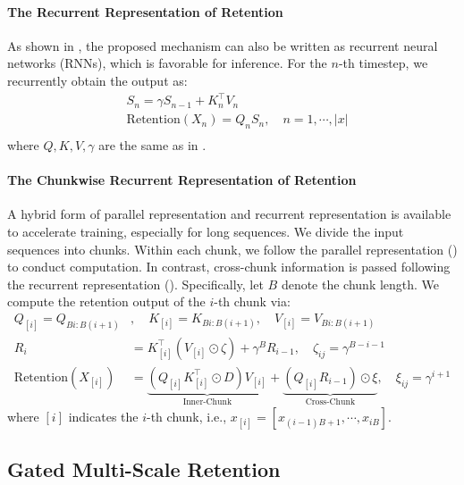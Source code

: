 \documentclass{article}
\begin{document}
\paragraph{The Recurrent Representation of Retention}
As shown in , the proposed mechanism can also be written as recurrent neural networks (RNNs), which is favorable for inference.
For the $n$-th timestep, we recurrently obtain the output as:
\begin{equation}
\begin{aligned}
\label{eq:ret:recurrent}
&S_n = \gamma S_{n-1} + K_n^{\intercal} V_n \\
&\mathrm{Rete}\mathrm{ntion} (X_n) = Q_n S_n, \quad n = 1, \cdots, |x| \\
\end{aligned}
\end{equation}
where $Q,K,V,\gamma$ are the same as in .

\paragraph{The Chunkwise Recurrent Representation of Retention}
A hybrid form of parallel representation and recurrent representation is available to accelerate training, especially for long sequences.
We divide the input sequences into chunks. Within each chunk, we follow the parallel representation () to conduct computation. In contrast, cross-chunk information is passed following the recurrent representation ().
Specifically, let $B$ denote the chunk length. We compute the retention output of the $i$-th chunk via:
\begin{equation}
\begin{aligned}
\label{eq:ret:chunk}
Q_{[i]} = Q_{Bi:B(i+1)} &,\quad K_{[i]} = K_{Bi:B(i+1)},\quad V_{[i]} = V_{Bi:B(i+1)} \\
R_{i}&=K_{[i]}^\intercal (V_{[i]}\odot \zeta)+\gamma^{B}R_{i-1}, \quad\zeta_{ij}=\gamma^{B-i-1}\\
\mathrm{Rete}\mathrm{ntion} (X_{[i]}) &= \underbrace{ (Q_{[i]} K^\intercal_{[i]}\odot D) V_{[i]} }_{\text{Inner-Chunk}} + \underbrace{ (Q_{[i]}R_{i-1}) \odot \xi}_{\text{Cross-Chunk}}, \quad\xi_{ij}=\gamma^{i+1}
\end{aligned}
\end{equation}
where ${[i]}$ indicates the $i$-th chunk, i.e., $x_{[i]} = [x_{(i-1)B+1} , \cdots , x_{iB}]$.


\subsection{Gated Multi-Scale Retention}
\label{sec:multiscale}
\end{document}
